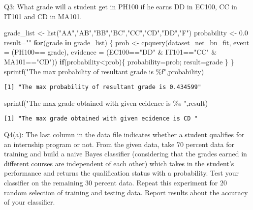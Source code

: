 \documentclass[
]{article}
\newenvironment{Shaded}{\begin{snugshade}}{\end{snugshade}}
\newcommand{\AttributeTok}[1]{\textcolor[rgb]{0.77,0.63,0.00}{#1}}
\newcommand{\ControlFlowTok}[1]{\textcolor[rgb]{0.13,0.29,0.53}{\textbf{#1}}}
\newcommand{\FloatTok}[1]{\textcolor[rgb]{0.00,0.00,0.81}{#1}}
\newcommand{\FunctionTok}[1]{\textcolor[rgb]{0.00,0.00,0.00}{#1}}
\newcommand{\NormalTok}[1]{#1}
\newcommand{\OtherTok}[1]{\textcolor[rgb]{0.56,0.35,0.01}{#1}}
\newcommand{\SpecialCharTok}[1]{\textcolor[rgb]{0.00,0.00,0.00}{#1}}
\newcommand{\StringTok}[1]{\textcolor[rgb]{0.31,0.60,0.02}{#1}}
\begin{document}
Q3: What grade will a student get in PH100 if he earns DD in EC100, CC
in IT101 and CD in MA101.

\begin{Shaded}
\begin{Highlighting}[]
\NormalTok{grade\_list }\OtherTok{\textless{}{-}} \FunctionTok{list}\NormalTok{(}\StringTok{"AA"}\NormalTok{,}\StringTok{"AB"}\NormalTok{,}\StringTok{"BB"}\NormalTok{,}\StringTok{"BC"}\NormalTok{,}\StringTok{"CC"}\NormalTok{,}\StringTok{"CD"}\NormalTok{,}\StringTok{"DD"}\NormalTok{,}\StringTok{"F"}\NormalTok{)}
\NormalTok{probability }\OtherTok{\textless{}{-}} \FloatTok{0.0}
\NormalTok{result}\OtherTok{=}\StringTok{""}
\ControlFlowTok{for}\NormalTok{(grade }\ControlFlowTok{in}\NormalTok{ grade\_list) \{}
\NormalTok{  prob }\OtherTok{\textless{}{-}} \FunctionTok{cpquery}\NormalTok{(dataset\_net\_bn\_fit, }\AttributeTok{event =}\NormalTok{ (PH100}\SpecialCharTok{==}\NormalTok{ grade), }\AttributeTok{evidence =}\NormalTok{ (EC100}\SpecialCharTok{==}\StringTok{"DD"} \SpecialCharTok{\&}\NormalTok{ IT101}\SpecialCharTok{==}\StringTok{"CC"} \SpecialCharTok{\&}\NormalTok{ MA101}\SpecialCharTok{==}\StringTok{"CD"}\NormalTok{))}
  \ControlFlowTok{if}\NormalTok{(probability}\SpecialCharTok{\textless{}}\NormalTok{prob)\{}
\NormalTok{    probability}\OtherTok{=}\NormalTok{prob;}
\NormalTok{    result}\OtherTok{=}\NormalTok{grade}
\NormalTok{  \}}
\NormalTok{\}}
\FunctionTok{sprintf}\NormalTok{(}\StringTok{"The max probability of resultant grade is \%f"}\NormalTok{,probability)}
\end{Highlighting}
\end{Shaded}

\begin{verbatim}
[1] "The max probability of resultant grade is 0.434599"
\end{verbatim}

\begin{Shaded}
\begin{Highlighting}[]
\FunctionTok{sprintf}\NormalTok{(}\StringTok{"The max grade obtained with given ecidence is \%s "}\NormalTok{,result)}
\end{Highlighting}
\end{Shaded}

\begin{verbatim}
[1] "The max grade obtained with given ecidence is CD "
\end{verbatim}

Q4(a): The last column in the data file indicates whether a student
qualifies for an internship program or not. From the given data, take 70
percent data for training and build a naive Bayes classifier
(considering that the grades earned in different courses are independent
of each other) which takes in the student's performance and returns the
qualification status with a probability. Test your classifier on the
remaining 30 percent data. Repeat this experiment for 20 random
selection of training and testing data. Report results about the
accuracy of your classifier.
\end{document}
